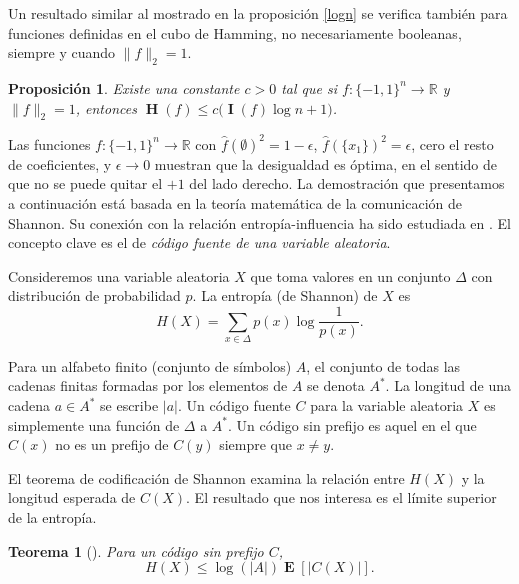 \documentclass[autocontact]{gaceta}
\newtheorem{theorem}{Teorema}
\newtheorem{proposition}{Proposición}
\DeclareMathOperator{\II}{\mathbf{I}}
\DeclareMathOperator{\EE}{\mathbf{E}}
\DeclareMathOperator{\HH}{\mathbf{H}}
\begin{document}
Un resultado similar al mostrado en la proposición \ref{logn} se verifica también para funciones definidas en el cubo de Hamming, no necesariamente booleanas, siempre y cuando $\|f\|_2 = 1$.

\begin{proposition}\label{prop:logn}
Existe una constante $c>0$ tal que si $f:\{-1,1\}^n\to\mathbb{R}$ y $\|f\|_2 = 1$, entonces $\HH(f)\leq c \big( \II(f)\log n+1\big)$.
\end{proposition}

Las funciones $f:\{-1,1\}^n\to \mathbb{R}$ con $\widehat{f}(\emptyset)^2=1-\epsilon$, $\widehat{f}(\{x_1\})^2=\epsilon$, cero el resto de coeficientes, y $\epsilon \to 0$ muestran que la desigualdad es óptima, en el sentido de que no se puede quitar el $+1$ del lado derecho. La demostración que presentamos a continuación está basada en la teoría matemática de la comunicación de Shannon. Su conexión con la relación entropía-influencia ha sido estudiada en \cite{WWW14}. El concepto clave es el de \emph{código fuente de una variable aleatoria}.

Consideremos una variable aleatoria $X$ que toma valores en un conjunto $\Delta$ con distribución de probabilidad $p$. La entropía (de Shannon) de $X$ es
\[
H(X) = \sum_{x\in\Delta} p(x)\log\frac{1}{p(x)}.
\]

Para un alfabeto finito (conjunto de símbolos) $A$, el conjunto de todas las cadenas finitas formadas por los elementos de $A$ se denota $A^*$. La longitud de una cadena $a\in A^*$ se escribe $|a|$. Un código fuente $C$ para la variable aleatoria $X$ es simplemente una función de $\Delta$ a $A^*$. Un código sin prefijo es aquel en el que $C(x)$ no es un prefijo de $C(y)$ siempre que $x\neq y$.

El teorema de codificación de Shannon \cite{Sha48} examina la relación entre $H(X)$ y la longitud esperada de $C(X)$. El resultado que nos interesa es el límite superior de la entropía.

\begin{theorem}[\cite{Sha48}] Para un código sin prefijo $C$,
\[
H(X)\leq \log (|A|) \EE[|C(X)|].
\]
\end{theorem}
\end{document}
